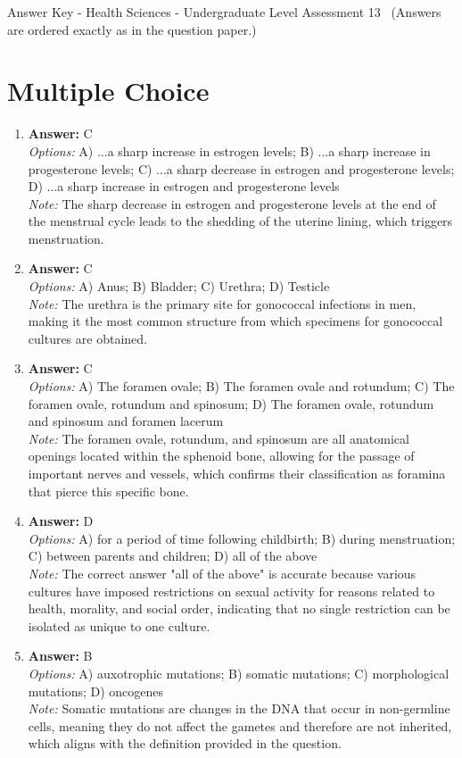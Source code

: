 \documentclass[12pt]{article}
\begin{document}
\begin{center}
Answer Key - Health Sciences - Undergraduate Level Assessment 13 \
\small (Answers are ordered exactly as in the question paper.)
\end{center}

\section*{Multiple Choice}
\begin{enumerate}[label=\arabic*.]
\item \textbf{Answer:} C
\\ \textit{Options:} A) ...a sharp increase in estrogen levels; B) ...a sharp increase in progesterone levels; C) ...a sharp decrease in estrogen and progesterone levels; D) ...a sharp increase in estrogen and progesterone levels
\\ \textit{Note:} The sharp decrease in estrogen and progesterone levels at the end of the menstrual cycle leads to the shedding of the uterine lining, which triggers menstruation.
\item \textbf{Answer:} C
\\ \textit{Options:} A) Anus; B) Bladder; C) Urethra; D) Testicle
\\ \textit{Note:} The urethra is the primary site for gonococcal infections in men, making it the most common structure from which specimens for gonococcal cultures are obtained.
\item \textbf{Answer:} C
\\ \textit{Options:} A) The foramen ovale; B) The foramen ovale and rotundum; C) The foramen ovale, rotundum and spinosum; D) The foramen ovale, rotundum and spinosum and foramen lacerum
\\ \textit{Note:} The foramen ovale, rotundum, and spinosum are all anatomical openings located within the sphenoid bone, allowing for the passage of important nerves and vessels, which confirms their classification as foramina that pierce this specific bone.
\item \textbf{Answer:} D
\\ \textit{Options:} A) for a period of time following childbirth; B) during menstruation; C) between parents and children; D) all of the above
\\ \textit{Note:} The correct answer "all of the above" is accurate because various cultures have imposed restrictions on sexual activity for reasons related to health, morality, and social order, indicating that no single restriction can be isolated as unique to one culture.
\item \textbf{Answer:} B
\\ \textit{Options:} A) auxotrophic mutations; B) somatic mutations; C) morphological mutations; D) oncogenes
\\ \textit{Note:} Somatic mutations are changes in the DNA that occur in non-germline cells, meaning they do not affect the gametes and therefore are not inherited, which aligns with the definition provided in the question.
\end{enumerate}
\end{document}
